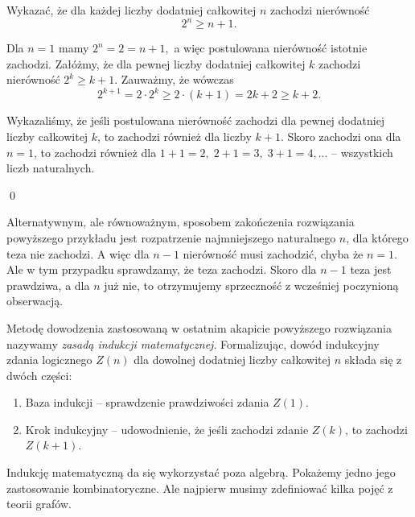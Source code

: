 


\noindent
Wykazać, że dla każdej liczby dodatniej całkowitej $n$ zachodzi nierówność
\[
	2^n \geqslant n + 1.
\]


\noindent
Dla $n = 1$ mamy $2^n = 2 = n + 1,$ a więc postulowana nierówność istotnie zachodzi.
Załóżmy, że dla pewnej liczby dodatniej całkowitej $k$ zachodzi nierówność ${2^k \geqslant k + 1}$. Zauważmy, że wówczas
\[
	2^{k + 1} = 2 \cdot 2^k \geqslant 2 \cdot (k + 1) = 2k + 2 \geqslant k + 2.
\]

\noindent
Wykazaliśmy, że jeśli postulowana nierówność zachodzi dla pewnej dodatniej liczby całkowitej $k$, to zachodzi również dla liczby $k + 1$. Skoro zachodzi ona dla $n = 1$, to zachodzi również dla $1 + 1 = 2,\; 2 + 1 = 3,\; 3 + 1 = 4, ...$ -- wszystkich liczb naturalnych.

\qed

\vspace{10px}

\noindent
Alternatywnym, ale równoważnym, sposobem zakończenia rozwiązania powyższego przykładu jest rozpatrzenie najmniejszego naturalnego $n$, dla którego teza nie zachodzi. A więc dla $n - 1$ nierówność musi zachodzić, chyba że $n = 1$. Ale w tym przypadku sprawdzamy, że teza zachodzi. Skoro dla $n - 1$ teza jest prawdziwa, a dla $n$ już nie, to otrzymujemy sprzeczność z wcześniej poczynioną obserwacją.

\vspace{10px}

\noindent
Metodę dowodzenia zastosowaną w ostatnim akapicie powyższego rozwiązania nazywamy \textit{zasadą indukcji matematycznej}.
Formalizując, dowód indukcyjny zdania logicznego $Z(n)$ dla dowolnej dodatniej liczby całkowitej $n$ składa się z dwóch części:
\begin{enumerate}
	\item Baza indukcji -- sprawdzenie prawdziwości zdania $Z(1)$.
	\item Krok indukcyjny -- udowodnienie, że jeśli zachodzi zdanie $Z(k)$, to zachodzi $Z(k + 1)$.
\end{enumerate}


\noindent
Indukcję matematyczną da się wykorzystać poza algebrą. Pokażemy jedno jego zastosowanie kombinatoryczne. Ale najpierw musimy zdefiniować kilka pojęć z teorii grafów.

